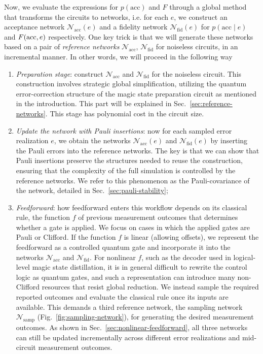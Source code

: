 \documentclass[aps,prx,twocolumn,superscriptaddress,longbibliography]{revtex4-2}
\begin{document}
Now, we evaluate the expressions for $p(\text{acc})$ and $F$ through a global method that transforms the circuits to networks, i.e. for each $e$, we construct an acceptance network $\mathcal N_{\text{acc}}(e)$ and a fidelity network $\mathcal N_{\text{fid}}(e)$ for $p(\text{acc}\mid e)$ and $F({\rm acc},e)$ respectively. One key trick is that we will generate these networks based on a pair of \emph{reference networks} $\mathcal N_{\text{acc}}$, $\mathcal N_{\text{fid}}$ for noiseless circuits, in an incremental manner. 
In other words, we will proceed in the following way
\begin{enumerate}
\item {\it Preparation stage}: 
construct $\mathcal N_{\text{acc}}$ and $\mathcal N_{\text{fid}}$ for the noiseless circuit. This construction involves strategic global simplification, utilizing the quantum error-correction structure of the magic state preparation circuit as mentioned in the introduction. 
This part will be explained in Sec.~\ref{sec:reference-networks}. 
This stage has polynomial cost in the circuit size.

\item {\it Update the network with Pauli insertions}:
now for each sampled error realization $e$, we obtain the networks $\mathcal N_{\text{acc}}(e)$ and $\mathcal N_{\text{fid}}(e)$ by inserting the Pauli errors into the reference networks.
The key is that we can show that Pauli insertions preserve the structures needed to reuse the construction, ensuring that the complexity of the full simulation is controlled by the reference networks. We refer to this phenomenon as the Pauli-covariance of the network, detailed in Sec.~\ref{sec:pauli-stability};

\item {\it Feedforward}: 
how feedforward enters this workflow depends on its classical rule,
the function $f$ of previous measurement outcomes that determines whether a gate is applied.
We focus on cases in which the applied gates are Pauli or Clifford.
If the function $f$ is linear (allowing offsets),
we represent the feedforward as a controlled quantum gate and incorporate it into the networks $\mathcal{N}_{\text{acc}}$ and $\mathcal{N}_{\text{fid}}$.
For nonlinear $f$, such as the decoder used in logical-level magic state distillation,
it is
in general 
difficult to rewrite the control logic as quantum gates,
and such a representation can introduce many non-Clifford resources that resist global reduction.
We instead sample the required reported outcomes and evaluate the classical rule once its inputs are available.
This demands a third reference network, the sampling network $\mathcal{N}_{\text{samp}}$ (Fig.~\ref{fig:sampling-network}),
for generating the desired measurement outcomes.
As shown in Sec.~\ref{sec:nonlinear-feedforward}, all three networks can still be updated incrementally
across different error realizations and mid-circuit measurement outcomes.
\end{enumerate}
\end{document}
